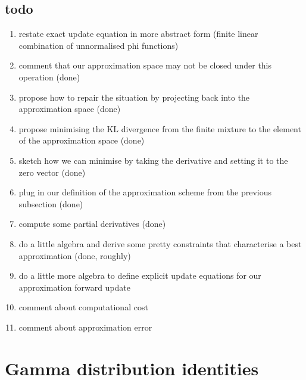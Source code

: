 \documentclass[twoside, 11pt]{article}
\begin{document}
\subsection{todo}

\begin{enumerate}
\item restate exact update equation in more abstract form (finite linear combination of unnormalised phi functions)
\item comment that our approximation space may not be closed under this operation (done)
\item propose how to repair the situation by projecting back into the approximation space (done)
\item propose minimising the KL divergence from the finite mixture to the element of the approximation space (done)
\item sketch how we can minimise by taking the derivative and setting it to the zero vector (done)
\item plug in our definition of the approximation scheme from the previous subsection (done)
\item compute some partial derivatives (done)
\item do a little algebra and derive some pretty constraints that characterise a best approximation (done, roughly)
\item do a little more algebra to define explicit update equations for our approximation forward update
\item comment about computational cost
\item comment about approximation error
\end{enumerate}

\appendix

\section{Gamma distribution identities}
\label{appendix:gammaconj}
\end{document}
